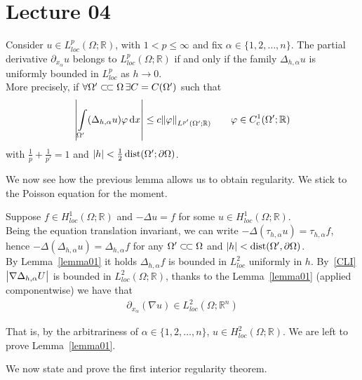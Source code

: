 \chapter{Lecture 04}

\begin{lem}[]\label{lemma01}
	Consider \( u\in L_{loc}^{p}(\Omega ;\mathbb{R}) \), with \( 1< p \leq  \infty  \) and fix \( \alpha \in \{ 1,2,\ldots,n \} \). The partial derivative \( \partial_{x_{\alpha }}u \) belongs to \( L_{loc}^{p}(\Omega ;\mathbb{R}) \) if and only if the family \( \Delta _{h,\alpha }u \) is uniformly bounded in \( L_{loc}^{p} \) as \( h \to 0 \).\\
	More precisely, if \( \forall \Omega' \ssubset \Omega \, \exists C=C(\Omega') \) such that
	\begin{gather}
		\abs{\int\limits_{\Omega'}^{} (\Delta _{h,\alpha }u) \varphi  \dd{x}}\leq c\norm{\varphi }_{L^{p'}(\Omega';\mathbb{R})} \qquad \varphi \in C_{c}^{1}(\Omega';\mathbb{R})
	\end{gather}
	with \( \frac{1}{p}+\frac{1}{p'}=1 \) and \( \abs{h}< \frac{1}{2} \operatorname{dist}(\Omega';\partial \Omega )  \).
\end{lem}
We now see how the previous lemma allows us to obtain regularity. We stick to the Poisson equation for the moment. \par
Suppose \( f \in H_{loc}^{1}(\Omega ;\mathbb{R})  \) and \( -\Delta u=f \) for some \( u \in H_{loc}^{1}(\Omega ; \mathbb{R})  \).\\
Being the equation translation invariant, we can write \( -\Delta (\tau _{h,\alpha }u) = \tau _{h, \alpha }f \), hence \( -\Delta (\Delta _{h, \alpha }u) = \Delta _{h, \alpha }f \) for any \( \Omega' \ssubset \Omega  \) and \( \abs{h}< \operatorname{dist}(\Omega', \partial \Omega )  \). \\
By Lemma~\ref{lemma01} it holds \( \Delta _{h, \alpha }f \) is bounded in \( L_{loc}^{2} \) uniformly in \( h \). By~\eqref{CLI} \( \abs{\nabla \Delta _{h, \alpha }U} \) is bounded in \( L_{loc}^{2}(\Omega ;\mathbb{R})  \), thanks to the Lemma~\ref{lemma01} (applied componentwise) we have that
\begin{gather}
	\partial_{x_{\alpha }}(\nabla u) \in L_{loc}^{2}(\Omega ;\mathbb{R}^{n})
\end{gather}

That is, by the arbitrariness of \( \alpha \in \{ 1,2,\ldots,n \} \), \( u \in H_{loc}^{2}(\Omega ;\mathbb{R})  \). We are left to prove Lemma~\ref{lemma01}.\\
\par
We now state and prove the first interior regularity theorem.


